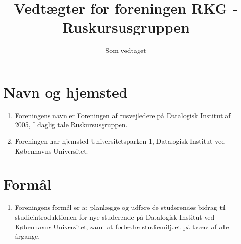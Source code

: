 \documentclass[a4paper, 10pt]{article}
\title{Vedtægter for foreningen RKG - Ruskursusgruppen}
\author{}
\date{Som vedtaget \vedtagsdato{}}
\newenvironment{stykenum}{
  \begin{enumerate}[%
    label=Stk.~\arabic*:, ref=\textsection~\theenumi~Stk.~\arabic*, start=1]
}{\end{enumerate}}
\begin{document}
\maketitle
\thispagestyle{first}

\section{Navn og hjemsted}
\begin{stykenum}
    \item \label{navn} Foreningens navn er Foreningen af rusvejledere på
        Datalogisk Institut af 2005, I daglig tale Ruskursusgruppen.

    \item \label{hjemsted} Foreningen har hjemsted Universitetsparken 1,
        Datalogisk Institut ved Københavns Universitet.
\end{stykenum}

\section{Formål}
\begin{stykenum}
\item \label{formaal} Foreningens formål er at planlægge og udføre de
    studerendes bidrag til studieintroduktionen for nye studerende på Datalogisk
    Institut ved Københavns Universitet, samt at forbedre studiemiljøet på tværs
    af alle årgange.
\end{stykenum}
\end{document}
